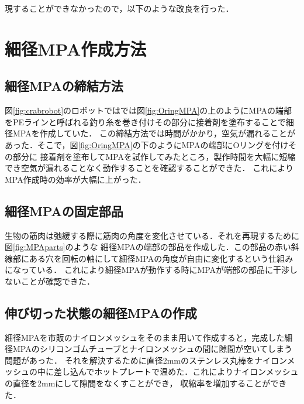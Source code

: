 \documentclass{jarticle}
\begin{document}
現することができなかったので，以下のような改良を行った．
\vspace*{-2mm}
\section{細径MPA作成方法}

\vspace*{-1mm}
\subsection{細径MPAの締結方法}

図\ref{fig:crabrobot}のロボットではでは図\ref{fig:OringMPA}の上のようにMPAの端部をPEラインと呼ばれる釣り糸を巻き付けその部分に接着剤を塗布することで細径MPAを作成していた．
この締結方法では時間がかかり，空気が漏れることがあった．そこで，図\ref{fig:OringMPA}の下のようにMPAの端部にOリングを付けその部分に
接着剤を塗布してMPAを試作してみたところ，製作時間を大幅に短縮でき空気が漏れることなく動作することを確認することができた．
これによりMPA作成時の効率が大幅に上がった．

\vspace*{-1mm}
\subsection{細径MPAの固定部品}

生物の筋肉は弛緩する際に筋肉の角度を変化させている．それを再現するために図\ref{fig:MPAparts}のような
細径MPAの端部の部品を作成した．この部品の赤い斜線部にある穴を回転の軸にして細径MPAの角度が自由に変化するという仕組みになっている．
これにより細径MPAが動作する時にMPAが端部の部品に干渉しないことが確認できた．

\vspace*{-1mm}
\subsection{伸び切った状態の細径MPAの作成}

細径MPAを市販のナイロンメッシュをそのまま用いて作成すると，完成した細径MPAのシリコンゴムチューブとナイロンメッシュの間に隙間が空いてしまう問題があった．
それを解決するために直径2mmのステンレス丸棒をナイロンメッシュの中に差し込んでホットプレートで温めた．これによりナイロンメッシュの直径を2mmにして隙間をなくすことができ，
収縮率を増加することができた．
\end{document}
